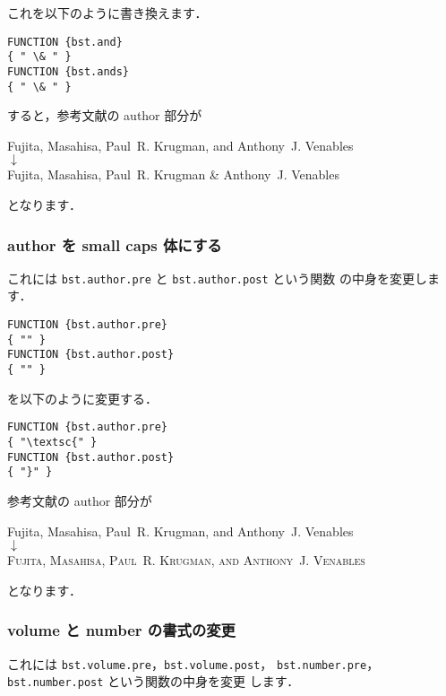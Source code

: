 \documentclass[a4j,10pt]{jarticle}
\begin{document}
これを以下のように書き換えます．
\begin{screen}
\begin{verbatim}
FUNCTION {bst.and}
{ " \& " }
FUNCTION {bst.ands}
{ " \& " }
\end{verbatim}
\end{screen}

すると，参考文献の author 部分が
\begin{center}
Fujita, Masahisa, Paul~R. Krugman, and Anthony~J. Venables \\
 $\downarrow$ \\
Fujita, Masahisa, Paul~R. Krugman \& Anthony~J. Venables 
\end{center}
となります．

\subsubsection{author を small caps 体にする}

これには \texttt{bst.author.pre} と \texttt{bst.author.post} という関数
の中身を変更します．

\begin{screen}
\begin{verbatim}
FUNCTION {bst.author.pre}
{ "" }
FUNCTION {bst.author.post}
{ "" }
\end{verbatim}
\end{screen}
を以下のように変更する．
\begin{screen}
\begin{verbatim}
FUNCTION {bst.author.pre}
{ "\textsc{" }
FUNCTION {bst.author.post}
{ "}" }
\end{verbatim}
\end{screen}

参考文献の author 部分が
\begin{center}
Fujita, Masahisa, Paul~R. Krugman, and Anthony~J. Venables \\
 $\downarrow$ \\
\textsc{Fujita, Masahisa, Paul~R. Krugman, and Anthony~J. Venables}
\end{center}
となります．

\subsubsection{volume と number の書式の変更}

これには \texttt{bst.volume.pre}，\texttt{bst.volume.post}，
\texttt{bst.number.pre}，\texttt{bst.number.post} という関数の中身を変更
します．
\end{document}

